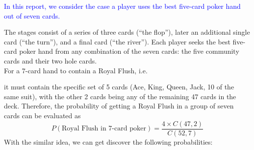 \documentclass{article}
\begin{document}
\begin{center}
    \textcolor{blue}{
        In this report, we consider the case a player uses the best 
        five-card poker hand out of seven cards.
    }
\end{center}
The stages consist of a series of three cards (``the flop''), later an 
additional single card (``the turn''), and a final card (``the river''). 
Each player seeks the best five-card poker hand from any combination of 
the seven cards: the five community cards and their two hole cards.
\vspace*{5mm}\\
For a 7-card hand to contain a Royal Flush, i.e.
\begin{center}
\end{center}
it must contain the specific set of 5 cards 
(Ace, King, Queen, Jack, 10 of the same suit), 
with the other 2 cards being any of the remaining 47 cards in the deck. 
Therefore, the probability of getting a Royal Flush in a group of seven 
cards can be evaluated as 
\[
P(\text{Royal Flush in 7-card poker}) = \frac{4 \times C(47, 2)}{C(52, 7)}
\]
With the similar idea, we can get discover the following probabilities:
\end{document}
